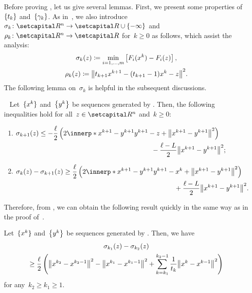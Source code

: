 \documentclass[../main]{subfiles}
\begin{document}
Before proving , let us give several lemmas.
First, we present some properties of~$\set{t_k}$ and~$\set*{\gamma_k}$.
As in~\cite{Tanabe2022a}, we also introduce~$\sigma_k \colon \setR^n \to \setR \cup \set{- \infty}$ and~$\rho_k \colon \setR^n \to \setR$ for~$k \ge 0$ as follows, which assist the analysis:
\begin{equation} \label{eq:sigma rho}
\begin{gathered} 
    \sigma_k(z) \coloneqq \min_{i = 1, \dots, m} \left[ F_i(x^k) - F_i(z) \right], \\
        \rho_k(z) \coloneqq \norm*{t_{k + 1} x^{k + 1} - (t_{k + 1} - 1) x^k - z}^2
.\end{gathered}
\end{equation}
The following lemma on~$\sigma_k$ is helpful in the subsequent discussions.
\begin{lemma}~\cite[Lemma 5.1]{Tanabe2022a} 
    Let~$\set{x^k}$ and~$\set*{y^k}$ be sequences generated by .
    Then, the following inequalities hold for all~$z \in \setR^n$ and~$k \ge 0$:
    \begin{enumerate}
        \item {} $\begin{multlined}[t] \sigma_{k + 1}(z) \le - \frac{\ell}{2} \left( 2 \innerp*{x^{k + 1} - y^{k + 1}}{y^{k + 1} - z} + \norm*{x^{k + 1} - y^{k + 1}}^2 \right)\\
            \displaystyle - \frac{\ell - L}{2} \norm*{x^{k + 1} - y^{k + 1}}^2;\end{multlined}$
        \item {}$\begin{multlined}[t]
                \sigma_k(z) - \sigma_{k + 1}(z) \ge \frac{\ell}{2} \left( 2 \innerp*{x^{k + 1} - y^{k + 1}}{y^{k + 1} - x^k} + \norm*{x^{k + 1} - y^{k + 1}}^2 \right) \\
            + \frac{\ell - L}{2} \norm*{x^{k + 1} - y^{k + 1}}^2
        .\end{multlined}$
    \end{enumerate}
\end{lemma}

Therefore, from , we can obtain the following result quickly in the same way as in the proof of~\cite[Corollary 5.1]{Tanabe2022a}.
\begin{lemma} 
    Let~$\set{x^k}$ and~$\set*{y^k}$ be sequences generated by .
    Then, we have
    \begin{multline}
        \sigma_{k_1}(z) - \sigma_{k_2}(z) \\
        \ge \frac{\ell}{2} \left( \norm*{x^{k_2} - x^{k_2 - 1}}^2 - \norm*{x^{k_1} - x^{k_1 - 1}}^2 + \sum_{k = k_1}^{k_2 - 1} \frac{1}{t_k} \norm*{x^k - x^{k - 1}}^2 \right)
    \end{multline}
    for any~$k_2 \ge k_1 \ge 1$.
\end{lemma}
\end{document}
